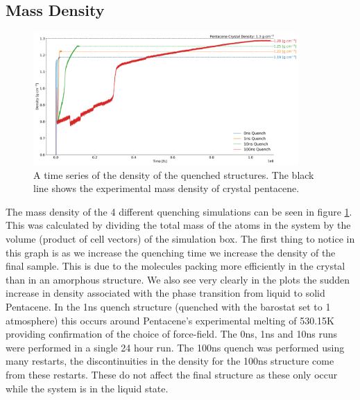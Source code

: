 \subsection{Mass Density}
\begin{figure}[ht]
	\centering
	\includegraphics[width=0.9\textwidth]{./img/DifferentQuenchTimes/Density.png}
	\caption{\label{fig:QuenchDensity}A time series of the density of the quenched structures. The black line shows the experimental mass density of crystal pentacene.}
\end{figure}
\noindent The mass density of the 4 different quenching simulations can be seen in figure \ref{fig:QuenchDensity}. This was calculated by dividing the total mass of the atoms in the system by the volume (product of cell vectors) of the simulation box. The first thing to notice in this graph is as we increase the quenching time we increase the density of the final sample. This is due to the molecules packing more efficiently in the crystal than in an amorphous structure. We also see very clearly in the plots the sudden increase in density associated with the phase transition from liquid to solid Pentacene. In the 1ns quench structure (quenched with the barostat set to 1 atmosphere) this occurs around Pentacene's experimental melting of 530.15K \cite{PentaceneMeltingPoint} providing confirmation of the choice of force-field. The 0ns, 1ns and 10ns runs were performed in a single 24 hour run. The 100ns quench was performed using many restarts, the discontinuities in the density for the 100ns structure come from these restarts. These do not affect the final structure as these only occur while the system is in the liquid state.

